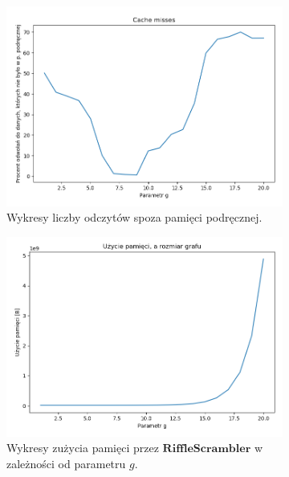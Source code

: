 \begin{figure}
	\begin{subfigure}{0.5\textwidth}
		\includegraphics[width=\textwidth]{bench_1.png}
		\centering
		\caption{Wykresy liczby odczytów spoza pamięci podręcznej.}
		\label{impl::b1}
	\end{subfigure}
	\begin{subfigure}{0.5\textwidth}
		\includegraphics[width=\textwidth]{bench_2.png}
		\centering
		\caption{Wykresy zużycia pamięci przez $\mathbf{RiffleScrambler}$ w zależności od parametru $g$.}
		\label{impl::b2}
	\end{subfigure}
	\begin{subfigure}{0.5\textwidth}

\end{subfigure}
\end{figure}
